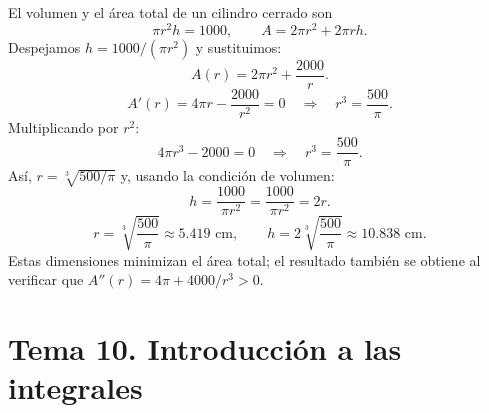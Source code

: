 \documentclass[12pt, letterpaper]{article}
\begin{document}
El volumen y el área total de un cilindro cerrado son
\[
\pi r^2h=1000,\qquad A=2\pi r^2+2\pi rh.
\]
Despejamos $h=1000/(\pi r^2)$ y sustituimos:
\[
A(r)=2\pi r^2+\frac{2000}{r}.
\]
\[
A'(r)=4\pi r-\frac{2000}{r^2}=0
\quad\Longrightarrow\quad r^3=\frac{500}{\pi}.
\]
Multiplicando por $r^2$:
\[
4\pi r^3-2000=0
\quad\Longrightarrow\quad
r^3=\frac{500}{\pi}.
\]
Así, $r=\sqrt[3]{500/\pi}$ y, usando la condición de volumen:
\[
h=\frac{1000}{\pi r^2}
=\frac{1000}{\pi r^2}
=2r.
\]
\[
\boxed{r=\sqrt[3]{\frac{500}{\pi}}\approx5.419\text{ cm},\qquad
h=2\sqrt[3]{\frac{500}{\pi}}\approx10.838\text{ cm}.}
\]
Estas dimensiones minimizan el área total; el resultado también se obtiene al verificar que $A''(r)=4\pi+4000/r^3>0$.


\newpage
\section{Tema 10. Introducción a las integrales}
\end{document}
